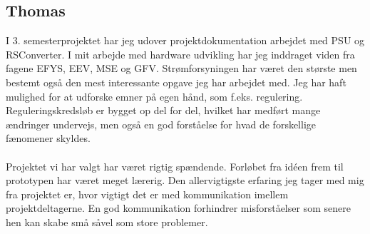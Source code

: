 \subsection{Thomas}
I 3. semesterprojektet har jeg udover projektdokumentation arbejdet med PSU og RSConverter. I mit arbejde med hardware udvikling har jeg inddraget viden fra fagene EFYS, EEV, MSE og GFV. Strømforsyningen har været den største men bestemt også den mest interessante opgave jeg har arbejdet med. Jeg har haft mulighed for at udforske emner på egen hånd, som f.eks. regulering. Reguleringskredsløb er bygget op del for del, hvilket har medført mange ændringer undervejs, men også en god forståelse for hvad de forskellige fænomener skyldes.
\\\\
Projektet vi har valgt har været rigtig spændende. Forløbet fra idéen frem til prototypen har været meget lærerig. Den allervigtigste erfaring jeg tager med mig fra projektet er, hvor vigtigt det er med kommunikation imellem projektdeltagerne. En god kommunikation forhindrer misforståelser som senere hen kan skabe små såvel som store problemer.